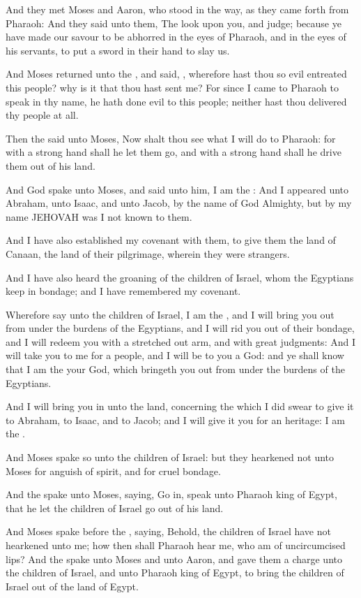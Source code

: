 \Verse And they met Moses and Aaron, who stood in the way, as they came forth from Pharaoh: \Verse And they said unto them, The \LORD look upon you, and judge; because ye have made our savour to be abhorred in the eyes of Pharaoh, and in the eyes of his servants, to put a sword in their hand to slay us.

\Verse And Moses returned unto the \LORD, and said, \LORD, wherefore hast thou so evil entreated this people? why is it that thou hast sent me?  \Verse For since I came to Pharaoh to speak in thy name, he hath done evil to this people; neither hast thou delivered thy people at all.

\Chapter
\Verse Then the \LORD said unto Moses, Now shalt thou see what I will do to Pharaoh: for with a strong hand shall he let them go, and with a strong hand shall he drive them out of his land.

\Verse And God spake unto Moses, and said unto him, I am the \LORD: \Verse And I appeared unto Abraham, unto Isaac, and unto Jacob, by the name of God Almighty, but by my name JEHOVAH was I not known to them.

\Verse And I have also established my covenant with them, to give them the land of Canaan, the land of their pilgrimage, wherein they were strangers.

\Verse And I have also heard the groaning of the children of Israel, whom the Egyptians keep in bondage; and I have remembered my covenant.

\Verse Wherefore say unto the children of Israel, I am the \LORD, and I will bring you out from under the burdens of the Egyptians, and I will rid you out of their bondage, and I will redeem you with a stretched out arm, and with great judgments: \Verse And I will take you to me for a people, and I will be to you a God: and ye shall know that I am the \LORD your God, which bringeth you out from under the burdens of the Egyptians.

\Verse And I will bring you in unto the land, concerning the which I did swear to give it to Abraham, to Isaac, and to Jacob; and I will give it you for an heritage: I am the \LORD.

\Verse And Moses spake so unto the children of Israel: but they hearkened not unto Moses for anguish of spirit, and for cruel bondage.

\Verse And the \LORD spake unto Moses, saying, \Verse Go in, speak unto Pharaoh king of Egypt, that he let the children of Israel go out of his land.

\Verse And Moses spake before the \LORD, saying, Behold, the children of Israel have not hearkened unto me; how then shall Pharaoh hear me, who am of uncircumcised lips?  \Verse And the \LORD spake unto Moses and unto Aaron, and gave them a charge unto the children of Israel, and unto Pharaoh king of Egypt, to bring the children of Israel out of the land of Egypt.


